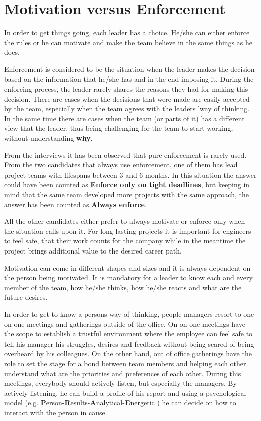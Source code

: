 \chapter{Motivation versus Enforcement}
\label{chapter:motivation}

In order to get things going, each leader has a choice. He/she can either enforce the rules or he can motivate and make the team believe in the same things as he does.

Enforcement is considered to be the situation when the leader makes the decision based on the information that he/she has and in the end imposing it. During the enforcing process, the leader rarely shares the reasons they had for making this decision. There are cases when the decisions that were made are easily accepted by the team, especially when the team agrees with the leaders 'way of thinking. In the same time there are cases when the team (or parts of it) has a different view that the leader, thus being challenging for the team to start working, without understanding \textbf{why}.

From the interviews  it has been observed that pure enforcement is rarely used. 
From the two candidates that always use enforcement, one of them has lead project teams with lifespans between 3 and 6 months. In this situation the answer could have been counted as \textbf{Enforce only on tight deadlines}, but keeping in mind that the same team developed more projects with the same approach, the answer has been counted as \textbf{Always enforce}.


All the other candidates either prefer to always motivate or enforce only when the situation calls upon it. For long lasting projects it is important for engineers to feel safe, that their work counts for the company while in the meantime the project brings additional value to the desired career path.

Motivation can come in different shapes and sizes and it is always dependent on the person being motivated. It is mandatory for a leader to know each and every member of the team, how he/she thinks, how he/she reacts and what are the future desires. 

In order to get to know a persons way of thinking, people managers resort to one-on-one meetings and gatherings outside of the office. On-on-one meetings have the scope to establish a trustful environment where the employee can feel safe to tell his manager his struggles, desires and feedback without being scared of  being overheard by his colleagues. On the other hand, out of office gatherings have the role to set the stage for a bond between team members and helping each other understand what are the priorities and preferences of each other. During this meetings, everybody should actively listen, but especially the managers. By actively listening, he can build a profile of his report and using a psychological model (e.g. \textbf{P}erson-\textbf{R}esults-\textbf{A}nalytical-\textbf{E}nergetic \cite{abur-pm}) he can decide on how to interact with the person in cause.

